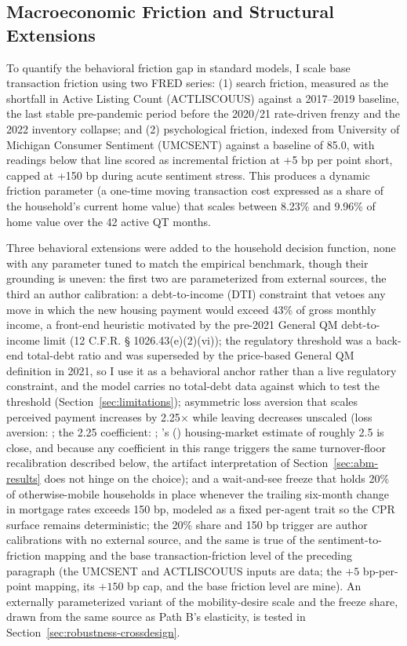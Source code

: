 \documentclass[12pt]{article}
\newcommand{\citepos}[1]{\citeauthor{#1}'s (\citeyear{#1})}
\begin{document}
\subsection{Macroeconomic Friction and Structural Extensions}\label{sec:method-frictions}

To quantify the behavioral friction gap in standard models, I scale base transaction friction using two FRED series: (1) search friction, measured as the shortfall in Active Listing Count (ACTLISCOUUS) against a 2017--2019 baseline, the last stable pre-pandemic period before the 2020/21 rate-driven frenzy and the 2022 inventory collapse; and (2) psychological friction, indexed from University of Michigan Consumer Sentiment (UMCSENT) against a baseline of 85.0, with readings below that line scored as incremental friction at +5 bp per point short, capped at +150 bp during acute sentiment stress. This produces a dynamic friction parameter (a one-time moving transaction cost expressed as a share of the household's current home value) that scales between 8.23\% and 9.96\% of home value over the 42 active QT months.

Three behavioral extensions were added to the household decision function, none with any parameter tuned to match the empirical benchmark, though their grounding is uneven: the first two are parameterized from external sources, the third an author calibration: a debt-to-income (DTI) constraint that vetoes any move in which the new housing payment would exceed 43\% of gross monthly income, a front-end heuristic motivated by the pre-2021 General QM debt-to-income limit (12 C.F.R. \S{} 1026.43(e)(2)(vi)); the regulatory threshold was a back-end total-debt ratio and was superseded by the price-based General QM definition in 2021, so I use it as a behavioral anchor rather than a live regulatory constraint, and the model carries no total-debt data against which to test the threshold (Section~\ref{sec:limitations}); asymmetric loss aversion that scales perceived payment increases by 2.25$\times$ while leaving decreases unscaled (loss aversion: \citealp{kahneman1979}; the 2.25 coefficient: \citealp{tversky1992}; \citepos{andersen2022} housing-market estimate of roughly 2.5 is close, and because any coefficient in this range triggers the same turnover-floor recalibration described below, the artifact interpretation of Section~\ref{sec:abm-results} does not hinge on the choice); and a wait-and-see freeze that holds 20\% of otherwise-mobile households in place whenever the trailing six-month change in mortgage rates exceeds 150 bp, modeled as a fixed per-agent trait so the CPR surface remains deterministic; the 20\% share and 150 bp trigger are author calibrations with no external source, and the same is true of the sentiment-to-friction mapping and the base transaction-friction level of the preceding paragraph (the UMCSENT and ACTLISCOUUS inputs are data; the $+5$ bp-per-point mapping, its $+150$ bp cap, and the base friction level are mine). An externally parameterized variant of the mobility-desire scale and the freeze share, drawn from the same source as Path B's elasticity, is tested in Section~\ref{sec:robustness-crossdesign}.
\end{document}
